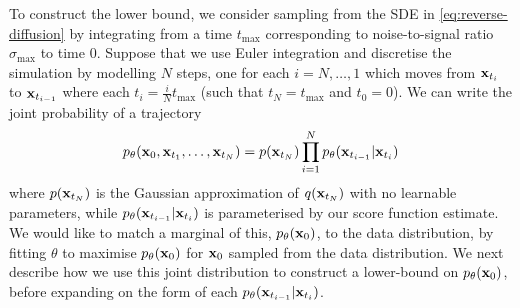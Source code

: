To construct the lower bound, we consider sampling from the SDE in \cref{eq:reverse-diffusion} by integrating from a time $t_\text{max}$ corresponding to noise-to-signal ratio $\sigma_\text{max}$ to time $0$. Suppose that we use Euler integration and discretise the simulation by modelling $N$ steps, one for each $i = N,\ldots,1$ which moves from ${\mathbf{x}}_{t_i}$ to ${\mathbf{x}}_{t_{i-1}}$  where each $t_i = \frac{i}{N} t_\text{max}$ (such that $t_N = t_\text{max}$ and $t_0 = 0$). We can write the joint probability of a trajectory
\begin{align} \label{eq:diffusion-reverse-joint-prob}
    p_\theta({\mathbf{x}}_0,{\mathbf{x}}_{t_1},\ldots,{\mathbf{x}}_{t_N}) = p({\mathbf{x}}_{t_N}) \prod_{i=1}^N p_\theta({\mathbf{x}}_{t_{i-1}} | {\mathbf{x}}_{t_i})
\end{align}
where $p({\mathbf{x}}_{t_N})$ is the Gaussian approximation of $q({\mathbf{x}}_{t_N})$ with no learnable parameters, while $p_\theta({\mathbf{x}}_{t_{i-1}} | {\mathbf{x}}_{t_i})$ is parameterised by our score function estimate. We would like to match a marginal of this, $p_\theta({\mathbf{x}}_0)$, to the data distribution, by fitting $\theta$ to maximise $p_\theta({\mathbf{x}}_0)$ for ${\mathbf{x}}_0$ sampled from the data distribution. We next describe how we use this joint distribution to construct a lower-bound on $p_\theta({\mathbf{x}}_0)$, before expanding on the form of each $p_\theta({\mathbf{x}}_{t_{i-1}}|{\mathbf{x}}_{t_i})$.

